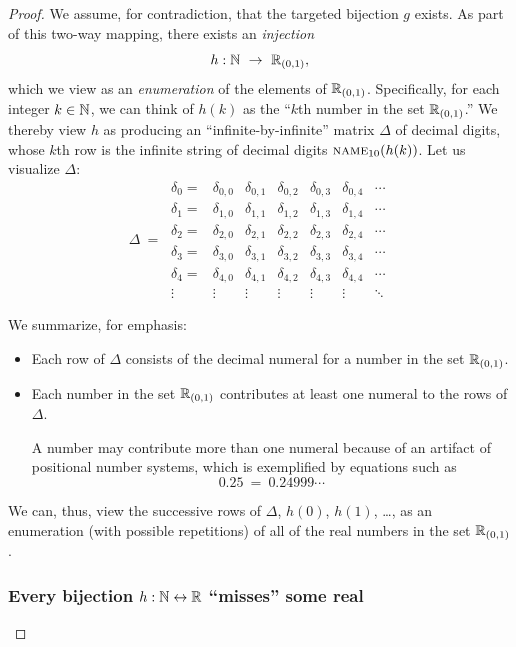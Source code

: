 \begin{proof}
We assume, for contradiction, that the targeted bijection $g$ exists.
As part of this two-way mapping, there exists an {\em injection}
\[ 
h: \N \ \rightarrow \ \R_{(0,1)},
\]
which we view as an {\em enumeration} of the elements of $\mathbb{R}_{(0,1)}$.
Specifically, for each integer $k \in \mathbb{N}$, we can think of $h(k)$ as
the ``$k$th number in the set $\mathbb{R}_{(0,1)}$.''  We thereby view $h$ as
producing an ``infinite-by-infinite'' matrix $\Delta$ of decimal
digits, whose $k$th row is the infinite string of decimal digits
$\mbox{\sc name}_{10}(h(k))$.  Let us visualize $\Delta$:
\[ \Delta \ = \
\begin{array}{ccccccc}
\delta_0 = &
\delta_{0,0} & \delta_{0,1} & \delta_{0,2} & \delta_{0,3} &
	\delta_{0,4} & \cdots \\
\delta_1 = &
\delta_{1,0} & \delta_{1,1} & \delta_{1,2} & \delta_{1,3} &
	\delta_{1,4} & \cdots \\
\delta_2 = &
\delta_{2,0} & \delta_{2,1} & \delta_{2,2} & \delta_{2,3} &
	\delta_{2,4} & \cdots \\
\delta_3 = &
\delta_{3,0} & \delta_{3,1} & \delta_{3,2} & \delta_{3,3} &
	\delta_{3,4} & \cdots \\ 
\delta_4 = &
\delta_{4,0} & \delta_{4,1} & \delta_{4,2} & \delta_{4,3} &
	\delta_{4,4} & \cdots \\ 
\vdots &
\vdots  & \vdots  & \vdots  & \vdots  & \vdots  & \ddots
\end{array}
\]

\noindent We summarize, for emphasis:
\begin{itemize}
\item
Each row of $\Delta$ consists of the decimal numeral for a number in
the set $\mathbb{R}_{(0,1)}$.

\item
Each number in the set $\mathbb{R}_{(0,1)}$ contributes at least one numeral
to the rows of $\Delta$.

A number may contribute more than one numeral because of an artifact
of positional number systems, which is exemplified by equations such
as
\[ 0.25 \ = \ 0.24999\cdots \]
\end{itemize}
We can, thus, view the successive rows of $\Delta$, $h(0)$, $h(1)$,
\ldots, as an enumeration (with possible repetitions) of all of the
real numbers in the set $\mathbb{R}_{(0,1)}$.

\subsubsection{Every bijection $h: \mathbb{N} \leftrightarrow \mathbb{R}$ ``misses'' some real}


\end{proof}
